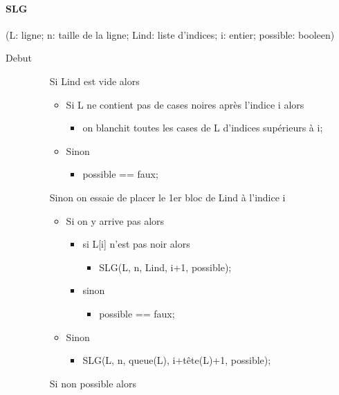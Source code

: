 \documentclass{article}
\begin{document}
\paragraph{SLG}(L: ligne; n: taille de la ligne; Lind: liste d'indices; i: entier; possible: booleen)
\begin{description}
\item[Debut]
\item[]
  \begin{itemize}
  \item[Si] Lind est vide alors 
    \begin{itemize}
    \item Si L ne contient pas de cases noires après l'indice i alors
      \begin{itemize}
      \item on blanchit toutes les cases de L d'indices supérieurs à i;
      \end{itemize}
    \item Sinon 
      \begin{itemize}
      \item possible == faux;
      \end{itemize}
    \end{itemize}
  \item[Sinon] on essaie de placer le 1er bloc de Lind à l'indice i
    \begin{itemize}
    \item Si on y arrive pas alors
      \begin{itemize}
      \item si L[i] n'est pas noir alors 
        \begin{itemize}
        \item SLG(L, n, Lind, i+1, possible);
        \end{itemize}
      \item sinon 
        \begin{itemize}
        \item possible == faux;
        \end{itemize}
      \end{itemize}
    \item Sinon
      \begin{itemize}
      \item SLG(L, n, queue(L), i+tête(L)+1, possible);
      \end{itemize}
    \end{itemize}
  \item[Si] non possible alors 
    \begin{itemize}

\end{itemize}
\end{itemize}
\end{description}
\end{document}
